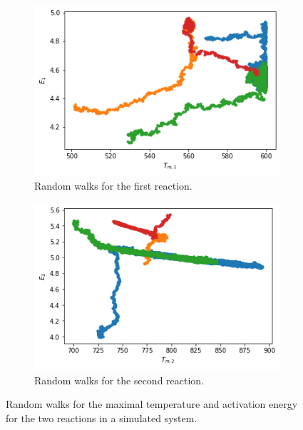 \begin{figure}[h!]
\centering
\begin{subfigure}{.5\textwidth}
  \centering
  \includegraphics[width=\linewidth]{figures/bayesian/2_reactions/E1vsTm1.png}
  \caption{Random walks for the first reaction.}
  \label{fig:subwalk1}
\end{subfigure}%
\begin{subfigure}{.5\textwidth}
  \centering
  \includegraphics[width=\linewidth]{figures/bayesian/2_reactions/E2vsTm2.png}
  \caption{Random walks for the second reaction.}
  \label{fig:subwalk2}
\end{subfigure}%
\caption{Random walks for the maximal temperature and activation energy for the two reactions in a simulated system.}
\label{fig:walks}
\end{figure}

